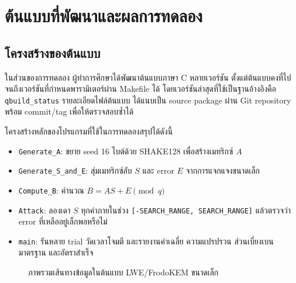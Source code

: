 \documentclass[14pt,a4paper]{extarticle}
\newcommand{\eng}[1]{\textenglish{#1}}
\newcommand{\code}[1]{\texttt{#1}}
\begin{document}
\section{ต้นแบบที่พัฒนาและผลการทดลอง}
\subsection{โครงสร้างของต้นแบบ}
ในส่วนของการทดลอง ผู้ทำการศึกษาได้พัฒนาต้นแบบภาษา C หลายเวอร์ชัน ตั้งแต่ต้นแบบคงที่ไปจนถึงเวอร์ชันที่กำหนดพารามิเตอร์ผ่าน \eng{Makefile} ได้ โดยเวอร์ชันล่าสุดที่ใช้เป็นฐานอ้างอิงคือ \code{qbuild\_status} รายละเอียดไฟล์ต้นแบบ ได้แนบเป็น source package ผ่าน Git repository พร้อม commit/tag เพื่อให้ตรวจสอบซ้ำได้

โครงสร้างหลักของโปรแกรมที่ใช้ในการทดลองสรุปได้ดังนี้
\begin{itemize}
    \item \code{Generate\_A}: ขยาย seed 16 ไบต์ด้วย \eng{SHAKE128} เพื่อสร้างเมทริกซ์ $A$
    \item \code{Generate\_S\_and\_E}: สุ่มเมทริกซ์ลับ $S$ และ error $E$ จากการแจกแจงขนาดเล็ก
    \item \code{Compute\_B}: คำนวณ $B = AS + E \pmod q$
    \item \code{Attack}: ลองเดา $S$ ทุกค่าภายในช่วง \code{[-SEARCH\_RANGE, SEARCH\_RANGE]} แล้วตรวจว่า error ที่เหลืออยู่เล็กพอหรือไม่
    \item \code{main}: รันหลาย trial วัดเวลาโจมตี และรายงานค่าเฉลี่ย ความแปรปรวน ส่วนเบี่ยงเบนมาตรฐาน และอัตราสำเร็จ
\end{itemize}

\begin{figure}[H]
    \centering
    \caption{ภาพรวมเส้นทางข้อมูลในต้นแบบ LWE/FrodoKEM ขนาดเล็ก}
\end{figure}
\end{document}
